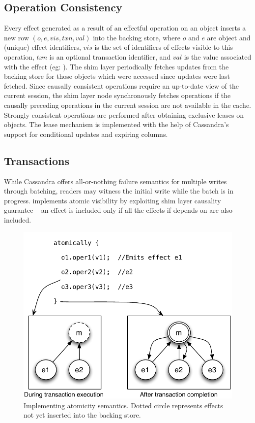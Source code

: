 \subsection{Operation Consistency}

Every effect generated as a result of an effectful operation on an object
inserts a new row $(o,e,vis,txn,val)$ into the backing store, where $o$ and $e$
are object and (unique) effect identifiers, $vis$ is the set of identifiers of
effects visible to this operation, $txn$ is an optional transaction identifier,
and $val$ is the value associated with the effect (eg: ). The
shim layer periodically fetches updates from the backing store for those objects
which were accessed since updates were last fetched. Since causally consistent
operations require an up-to-date view of the current session, the shim layer
node synchronously fetches operations if the causally preceding operations in
the current session are not available in the cache.  Strongly consistent
operations are performed after obtaining exclusive leases on objects. The lease
mechanism is implemented with the help of Cassandra's support for conditional
updates and expiring columns.

\subsection{Transactions}

While Cassandra offers all-or-nothing failure semantics for multiple writes
through batching, readers may witness the initial write while the batch is in
progress. \quelea implements atomic visibility by exploiting shim layer causality
guarantee -- an effect is included only if all the effects if depends on are
also included.

\begin{figure}[t]
\begin{center}
\includegraphics[width=0.7\columnwidth]{Figures/AtomicityImpl}
\end{center}
\caption{Implementing atomicity semantics. Dotted circle represents effects not yet inserted into the backing store.}
\label{fig:atomicity_impl}
\end{figure}

